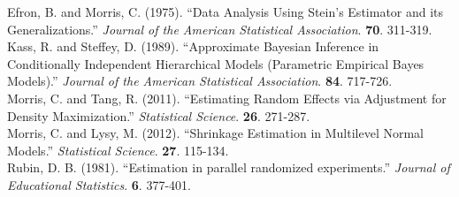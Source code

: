 \documentclass[article]{jss}
\begin{document}
Efron, B. and Morris, C. (1975). ``Data Analysis Using Stein's Estimator and its Generalizations.'' \emph{Journal of the American Statistical Association}. \textbf{70}. 311-319.
\\

Kass, R. and Steffey, D. (1989). ``Approximate Bayesian Inference in Conditionally Independent Hierarchical Models (Parametric
Empirical Bayes Models).'' \emph{Journal of the American Statistical Association}. \textbf{84}. 717-726.
\\

Morris, C. and Tang, R. (2011). ``Estimating Random Effects via Adjustment for Density Maximization.'' \emph{Statistical Science}. \textbf{26}. 271-287.
\\

Morris, C. and Lysy, M. (2012). ``Shrinkage Estimation in Multilevel Normal Models.'' \emph{Statistical Science}. \textbf{27}. 115-134.
\\

Rubin, D. B. (1981). ``Estimation in parallel randomized
  experiments.'' \emph{Journal of Educational Statistics}. \textbf{6}. 377-401.
\\
\end{document}
